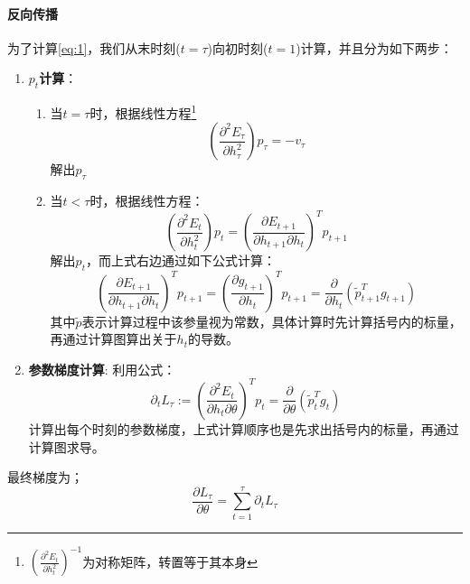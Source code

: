 \documentclass[UTF8]{ctexart}   %
\newcommand{\ptl}[2]{\frac{\partial #1}{\partial #2}}
\begin{document}
        \paragraph{反向传播}
        为了计算\ref{eq:1}，我们从末时刻($t = \tau$)向初时刻($t = 1$)计算，并且分为如下两步：
        \begin{enumerate}
            \item \textbf{$p_t$计算}：
                \begin{enumerate}
                    \item 当$t = \tau$时，根据线性方程\footnote{$\left(\ptl{^2 E_t}{h_t^2}\right)^{-1}$为对称矩阵，转置等于其本身}
                        \begin{equation}
                            \left(\ptl{^2 E_\tau}{h_\tau^2}\right) p_\tau = -v_\tau
                        \end{equation}
                        解出$p_\tau$
                    \item 当$t < \tau$时，根据线性方程：
                        \begin{equation}
                            \left(\ptl{^2 E_t}{h_t^2}\right) p_t = \left(\ptl{E_{t+1}}{h_{t+1} \partial h_t}\right)^T p_{t+1}
                        \end{equation}
                        解出$p_t$，而上式右边通过如下公式计算：
                        \begin{equation}
                            \left(\ptl{E_{t+1}}{h_{t+1} \partial h_t}\right)^T p_{t+1} = \left(\ptl{g_{t+1}}{h_t}\right)^T p_{t+1} = \ptl{}{h_t}(\tilde{p}_{t+1}^T g_{t+1})
                        \end{equation}
                        其中$\tilde{p}$表示计算过程中该参量视为常数，具体计算时先计算括号内的标量，再通过计算图算出关于$h_t$的导数。
                \end{enumerate}

            \item \textbf{参数梯度计算}:
                利用公式：
                \begin{equation}
                    \partial_t L_\tau := \left(\ptl{^2 E_t}{h_t \partial \theta}\right)^T p_t = \ptl{}{\theta}\left(\tilde{p}_t^T g_t\right)
                \end{equation}
                计算出每个时刻的参数梯度，上式计算顺序也是先求出括号内的标量，再通过计算图求导。
        \end{enumerate}

        最终梯度为；
        \begin{equation}
            \frac{\partial L_\tau}{\partial \theta} = \sum_{t=1}^{\tau} \partial_t L_\tau
        \end{equation}
\end{document}
